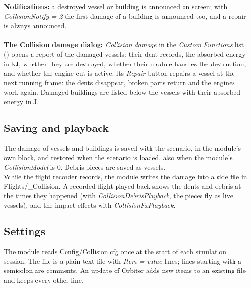 \documentclass[Orbiter User Manual.tex]{subfiles}
\begin{document}
\noindent
\textbf{Notifications:} a destroyed vessel or building is announced on screen; with \textit{CollisionNotify = 2} the first damage of a building is announced too, and a repair is always announced.\\
\\
\textbf{The Collision damage dialog:} \textit{Collision damage} in the \textit{Custom Functions} list (\Ctrl{}) opens a report of the damaged vessels: their dent records, the absorbed energy in kJ, whether they are destroyed, whether their module handles the destruction, and whether the engine cut is active. Its \textit{Repair} button repairs a vessel at the next running frame: the dents disappear, broken parts return and the engines work again. Damaged buildings are listed below the vessels with their absorbed energy in J.


\subsection{Saving and playback}
The damage of vessels and buildings is saved with the scenario, in the module's own block, and restored when the scenario is loaded, also when the module's \textit{CollisionModel} is 0. Debris pieces are saved as vessels.\\
While the flight recorder records, the module writes the damage into a side file in Flights/\_Collision. A recorded flight played back shows the dents and debris at the times they happened (with \textit{CollisionDebrisPlayback}, the pieces fly as live vessels), and the impact effects with \textit{CollisionFxPlayback}.


\subsection{Settings}
\label{ssec:coll_cfg}
The module reads Config/Collision.cfg once at the start of each simulation session. The file is a plain text file with \textit{Item = value} lines; lines starting with a semicolon are comments. An update of Orbiter adds new items to an existing file and keeps every other line.
\end{document}
